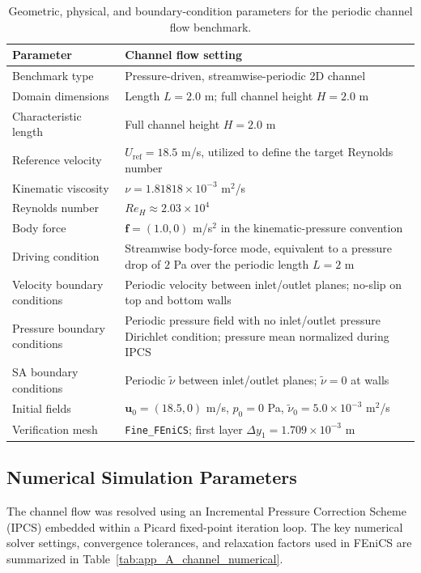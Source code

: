 \begin{table}[htbp]
	\centering
	\footnotesize
	\caption{Geometric, physical, and boundary-condition parameters for the periodic channel flow benchmark.}
	\label{tab:app_A_channel_physical}
	\renewcommand{\arraystretch}{1.2}
	\begin{tabularx}{\textwidth}{l X}
		\hline
		\textbf{Parameter} & \textbf{Channel flow setting} \\
		\hline
		Benchmark type & Pressure-driven, streamwise-periodic 2D channel \\
		Domain dimensions & Length $L=2.0$ m; full channel height $H=2.0$ m \\
		Characteristic length & Full channel height $H=2.0$ m \\
		Reference velocity & $U_{\mathrm{ref}}=18.5$ m/s, utilized to define the target Reynolds number \\
		Kinematic viscosity & $\nu = 1.81818 \times 10^{-3}$ m$^2$/s \\
		Reynolds number & $Re_H \approx 2.03 \times 10^4$ \\
			Body force & $\mathbf{f}=(1.0,0)$ m/s$^2$ in the kinematic-pressure convention \\
			Driving condition & Streamwise body-force mode, equivalent to a pressure drop of $2$ Pa over the periodic length $L=2$ m \\
			Velocity boundary conditions & Periodic velocity between inlet/outlet planes; no-slip on top and bottom walls \\
			Pressure boundary conditions & Periodic pressure field with no inlet/outlet pressure Dirichlet condition; pressure mean normalized during IPCS \\
			SA boundary conditions & Periodic $\tilde{\nu}$ between inlet/outlet planes; $\tilde{\nu}=0$ at walls \\
			Initial fields & $\mathbf{u}_0=(18.5,0)$ m/s, $p_0=0$ Pa, $\tilde{\nu}_0=5.0 \times 10^{-3}$ m$^2$/s \\
		Verification mesh & \texttt{Fine\_FEniCS}; first layer $\Delta y_1 = 1.709 \times 10^{-3}$ m \\
		\hline
	\end{tabularx}
\end{table}

\subsection{Numerical Simulation Parameters}
\label{subsec:app_A_channel_numerical}
The channel flow was resolved using an Incremental Pressure Correction Scheme (IPCS) embedded within a Picard fixed-point iteration loop. The key numerical solver settings, convergence tolerances, and relaxation factors used in FEniCS are summarized in Table~\ref{tab:app_A_channel_numerical}.


